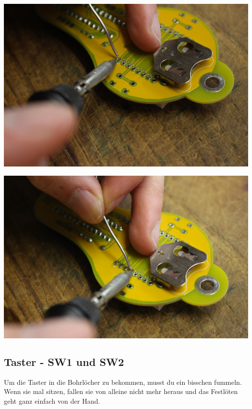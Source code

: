 \documentclass{article}
\begin{document}
\begin{minipage}[b]{0.5\textwidth}
	\includegraphics[width=\textwidth]{Bilder/IMG_5579.JPG}
\end{minipage}
\begin{minipage}[b]{0.5\textwidth}
	\includegraphics[width=\textwidth]{Bilder/IMG_5580.JPG}
\end{minipage}

\subsection{Taster - SW1 und SW2}

Um die Taster in die Bohrlöcher zu bekommen, musst du ein bisschen fummeln. Wenn sie mal sitzen, fallen sie von alleine nicht mehr heraus und das Festlöten geht ganz einfach von der Hand.
\end{document}
